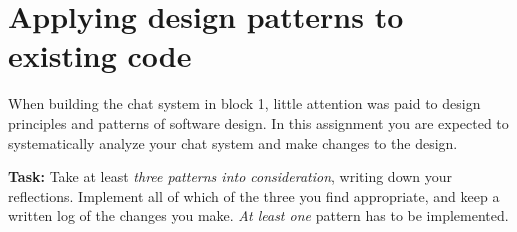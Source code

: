 \documentclass{article}
\begin{document}
\pagebreak
\section{Applying design patterns to existing code}
  When building the chat system in block 1, little attention was paid to design principles and patterns of software design. In this assignment you are expected to systematically analyze your chat system and make changes to the design.

  \vspace{0.3cm}

  \noindent  \textbf{Task:} Take at least \emph{three patterns into consideration}, writing down your reflections. Implement all of which of the three you find appropriate, and keep a written log of the changes you make. \emph{At least one} pattern has to be implemented.
\end{document}
